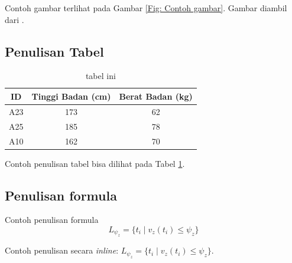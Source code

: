 Contoh gambar terlihat pada Gambar \ref{Fig: Contoh gambar}. Gambar diambil dari \cite{wibowo2016clustering}.

\subsection{Penulisan Tabel}
\begin{table}[h]
	\caption{tabel ini}
	\vspace{0.5em}
	\centering
	\begin{tabular}{|c|c|c|}
		\hline
		ID & Tinggi Badan (cm) & Berat Badan (kg) \\
		\hline \hline
		A23 & 173 & 62 \\
		A25 & 185 & 78 \\
		A10 & 162 & 70 \\ \hline
	\end{tabular}
	\label{Tab: Tabel Tinggi Berat}
\end{table}
Contoh penulisan tabel bisa dilihat pada Tabel \ref{Tab: Tabel Tinggi Berat}.

\subsection{Penulisan formula}
Contoh penulisan formula
\begin{equation}
L_{\psi_z} = \{ t_i \mid v_z(t_i) \le \psi_z \}
\end{equation}

Contoh penulisan secara \textit{inline}: $L_{\psi_z} = \{ t_i \mid v_z(t_i) \le \psi_z \}$.